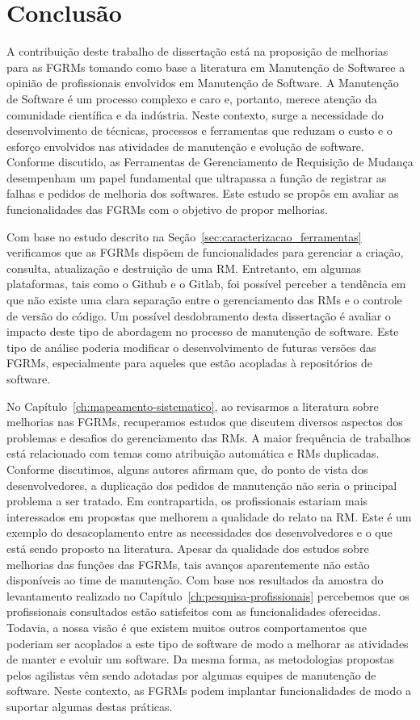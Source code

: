 \chapter{Conclusão}
\label{ch:conclusao_trab_futuros}

A contribuição deste trabalho de dissertação está na proposição de melhorias
para as FGRMs tomando como base a literatura em Manutenção de Softwaree a
opinião de profissionais envolvidos em Manutenção de Software. A Manutenção de
Software é um processo complexo e caro e, portanto, merece atenção da comunidade
científica e da indústria. Neste contexto, surge a necessidade do
desenvolvimento de técnicas, processos e ferramentas que reduzam o custo e o
esforço envolvidos nas atividades de manutenção e evolução de software. Conforme
discutido, as Ferramentas de Gerenciamento de Requisição de Mudança desempenham
um papel fundamental que ultrapassa a função de registrar as falhas e pedidos de
melhoria dos softwares. Este estudo se propôs em avaliar as funcionalidades das
FGRMs com o objetivo de propor melhorias.

Com base no estudo descrito na Seção~\ref{sec:caracterizacao_ferramentas}
verificamos que as FGRMs dispõem de funcionalidades para gerenciar a criação,
consulta, atualização e destruição de uma RM\@. Entretanto, em algumas
plataformas, tais como o Github e o Gitlab, foi possível perceber a tendência em
que não existe uma clara separação entre o gerenciamento das RMs e o controle de
versão do código. Um possível desdobramento desta dissertação é avaliar o
impacto deste tipo de abordagem no processo de manutenção de software. Este tipo
de análise poderia modificar o desenvolvimento de futuras versões das FGRMs,
especialmente para aqueles que estão acopladas à repositórios de software.

No Capítulo~\ref{ch:mapeamento-sistematico}, ao revisarmos a literatura sobre
melhorias nas FGRMs, recuperamos estudos que discutem diversos aspectos dos
problemas e desafios do gerenciamento das RMs. A maior frequência de trabalhos
está relacionado com temas como atribuição automática e RMs duplicadas. Conforme
discutimos, alguns autores afirmam que, do ponto de vista dos desenvolvedores, a
duplicação dos pedidos de manutenção não seria o principal problema a ser
tratado. Em contrapartida, os profissionais estariam mais interessados em
propostas que melhorem a qualidade do relato na RM\@. Este é um exemplo do
desacoplamento entre as necessidades dos desenvolvedores e o que está sendo
proposto na literatura. Apesar da qualidade dos estudos sobre melhorias das
funções das FGRMs, tais avanços aparentemente não estão disponíveis ao time de
manutenção. Com base nos resultados da amostra do levantamento realizado no
Capítulo~\ref{ch:pesquisa-profissionais} percebemos que os profissionais
consultados estão satisfeitos com as funcionalidades oferecidas. Todavia, a
nossa visão é que existem muitos outros comportamentos que poderiam ser
acoplados a este tipo de software de modo a melhorar as atividades de manter e
evoluir um software. Da mesma forma, as metodologias propostas pelos agilistas
vêm sendo adotadas por algumas equipes de manutenção de software. Neste
contexto, as FGRMs podem implantar funcionalidades de modo a suportar algumas
destas práticas.

